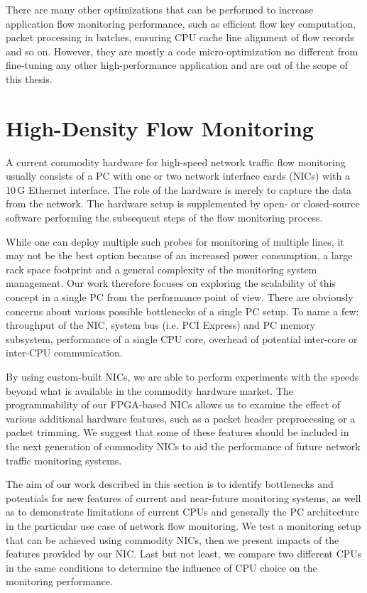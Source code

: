 There are many other optimizations that can be performed to increase application flow monitoring performance, such as efficient flow key computation, packet processing in batches, ensuring CPU cache line alignment of flow records and so on. However, they are mostly a code micro-optimization no different from fine-tuning any other high-performance application and are out of the scope of this thesis.


\section{High-Density Flow Monitoring}\label{sec:performance-high-density}

A current commodity hardware for high-speed network traffic flow monitoring usually consists of a PC with one or two network interface cards (NICs) with a 10\,G Ethernet interface. The role of the hardware is merely to capture the data from the network. The hardware setup is supplemented by open- or closed-source software performing the subsequent steps of the flow monitoring process.

While one can deploy multiple such probes for monitoring of multiple lines, it may not be the best option because of an increased power consumption, a large rack space footprint and a general complexity of the monitoring system management. Our work therefore focuses on exploring the scalability of this concept in a single PC from the performance point of view. There are obviously concerns about various possible bottlenecks of a single PC setup. To name a few: throughput of the NIC, system bus (i.e. PCI Express) and PC memory subsystem, performance of a single CPU core, overhead of potential inter-core or inter-CPU communication.

By using custom-built NICs, we are able to perform experiments with the speeds beyond what is available in the commodity hardware market. The programmability of our FPGA-based NICs allows us to examine the effect of various additional hardware features, such as a packet header preprocessing or a packet trimming. We suggest that some of these features should be included in the next generation of commodity NICs to aid the performance of future network traffic monitoring systems.

The aim of our work described in this section is to identify bottlenecks and potentials for new features of current and near-future monitoring systems, as well as to demonstrate limitations of current CPUs and generally the PC architecture in the particular use case of network flow monitoring. We test a monitoring setup that can be achieved using commodity NICs, then we present impacts of the features provided by our NIC. Last but not least, we compare two different CPUs in the same conditions to determine the influence of CPU choice on the monitoring performance.

